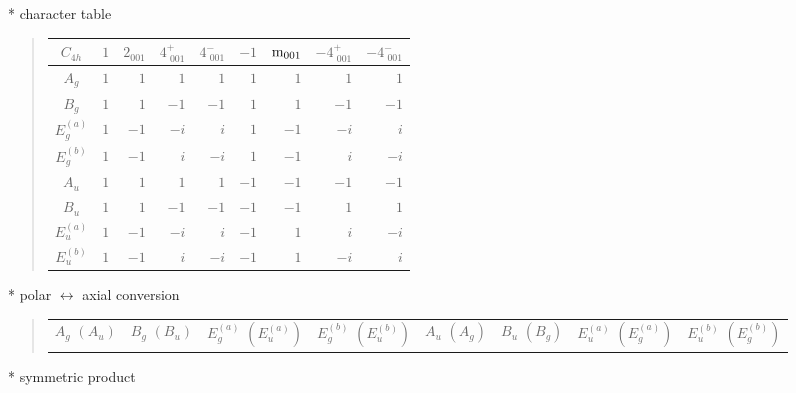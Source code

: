 \documentclass[fleqn,10pt,landscape]{jsarticle}
\begin{document}
* character table
\begin{quote}
\begin{tabular}{crrrrrrrr} \hline \hline
$ C_{4h} $ & $ 1 $ & $ 2{}_{001} $ & $ 4^{+}_{\,\,001} $ & $ 4^{-}_{\,\,001} $ & $ -1 $ & $ {\rm m}_{001} $ & $ -4^{+}_{\,\,001} $ & $ -4^{-}_{\,\,001} $ \\ \hline
$ A_{g} $ & $ 1 $ & $ 1 $ & $ 1 $ & $ 1 $ & $ 1 $ & $ 1 $ & $ 1 $ & $ 1 $ \\
$ B_{g} $ & $ 1 $ & $ 1 $ & $ -1 $ & $ -1 $ & $ 1 $ & $ 1 $ & $ -1 $ & $ -1 $ \\
$ E_{g}^{(a)} $ & $ 1 $ & $ -1 $ & $ - i $ & $ i $ & $ 1 $ & $ -1 $ & $ - i $ & $ i $ \\
$ E_{g}^{(b)} $ & $ 1 $ & $ -1 $ & $ i $ & $ - i $ & $ 1 $ & $ -1 $ & $ i $ & $ - i $ \\
$ A_{u} $ & $ 1 $ & $ 1 $ & $ 1 $ & $ 1 $ & $ -1 $ & $ -1 $ & $ -1 $ & $ -1 $ \\
$ B_{u} $ & $ 1 $ & $ 1 $ & $ -1 $ & $ -1 $ & $ -1 $ & $ -1 $ & $ 1 $ & $ 1 $ \\
$ E_{u}^{(a)} $ & $ 1 $ & $ -1 $ & $ - i $ & $ i $ & $ -1 $ & $ 1 $ & $ i $ & $ - i $ \\
$ E_{u}^{(b)} $ & $ 1 $ & $ -1 $ & $ i $ & $ - i $ & $ -1 $ & $ 1 $ & $ - i $ & $ i $ \\
 \hline \hline
\end{tabular}
\end{quote}
* polar $\leftrightarrow$ axial conversion
\begin{quote}
\begin{tabular}{cccccccc}
$ A_{g}\,\,(A_{u}) $ & $ B_{g}\,\,(B_{u}) $ & $ E_{g}^{(a)}\,\,(E_{u}^{(a)}) $ & $ E_{g}^{(b)}\,\,(E_{u}^{(b)}) $ & $ A_{u}\,\,(A_{g}) $ & $ B_{u}\,\,(B_{g}) $ & $ E_{u}^{(a)}\,\,(E_{g}^{(a)}) $ & $ E_{u}^{(b)}\,\,(E_{g}^{(b)}) $
\end{tabular}
\end{quote}
* symmetric product
\end{document}
